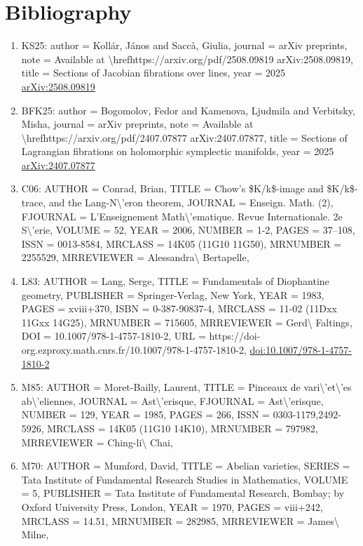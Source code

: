 \documentclass[11pt]{article}
\begin{document}
\section*{Bibliography}
\begin{enumerate}[leftmargin=*]
  \item KS25: author = Kollár, János and Saccà, Giulia, journal = arXiv preprints, note = Available at \textbackslash{}hrefhttps://arxiv.org/pdf/2508.09819 arXiv:2508.09819, title = Sections of Jacobian fibrations over lines, year = 2025 \href{https://arxiv.org/abs/2508.09819}{arXiv:2508.09819}
  \item BFK25: author = Bogomolov, Fedor and Kamenova, Ljudmila and Verbitsky, Misha, journal = arXiv preprints, note = Available at \textbackslash{}hrefhttps://arxiv.org/pdf/2407.07877 arXiv:2407.07877, title = Sections of Lagrangian fibrations on holomorphic symplectic manifolds, year = 2025 \href{https://arxiv.org/abs/2407.07877}{arXiv:2407.07877}
  \item C06: AUTHOR = Conrad, Brian, TITLE = Chow's \$K/k\$-image and \$K/k\$-trace, and the Lang-N\textbackslash{}'eron theorem, JOURNAL = Enseign. Math. (2), FJOURNAL = L'Enseignement Math\textbackslash{}'ematique. Revue Internationale. 2e S\textbackslash{}'erie, VOLUME = 52, YEAR = 2006, NUMBER = 1-2, PAGES = 37--108, ISSN = 0013-8584, MRCLASS = 14K05 (11G10 11G50), MRNUMBER = 2255529, MRREVIEWER = Alessandra\textbackslash{} Bertapelle,
  \item L83: AUTHOR = Lang, Serge, TITLE = Fundamentals of Diophantine geometry, PUBLISHER = Springer-Verlag, New York, YEAR = 1983, PAGES = xviii+370, ISBN = 0-387-90837-4, MRCLASS = 11-02 (11Dxx 11Gxx 14G25), MRNUMBER = 715605, MRREVIEWER = Gerd\textbackslash{} Faltings, DOI = 10.1007/978-1-4757-1810-2, URL = https://doi-org.ezproxy.math.cnrs.fr/10.1007/978-1-4757-1810-2, \href{https://doi.org/10.1007/978-1-4757-1810-2}{doi:10.1007/978-1-4757-1810-2}
  \item M85: AUTHOR = Moret-Bailly, Laurent, TITLE = Pinceaux de vari\textbackslash{}'et\textbackslash{}'es ab\textbackslash{}'eliennes, JOURNAL = Ast\textbackslash{}'erisque, FJOURNAL = Ast\textbackslash{}'erisque, NUMBER = 129, YEAR = 1985, PAGES = 266, ISSN = 0303-1179,2492-5926, MRCLASS = 14K05 (11G10 14K10), MRNUMBER = 797982, MRREVIEWER = Ching-li\textbackslash{} Chai,
  \item M70: AUTHOR = Mumford, David, TITLE = Abelian varieties, SERIES = Tata Institute of Fundamental Research Studies in Mathematics, VOLUME = 5, PUBLISHER = Tata Institute of Fundamental Research, Bombay; by Oxford University Press, London, YEAR = 1970, PAGES = viii+242, MRCLASS = 14.51, MRNUMBER = 282985, MRREVIEWER = James\textbackslash{} Milne,

\end{enumerate}
\end{document}
